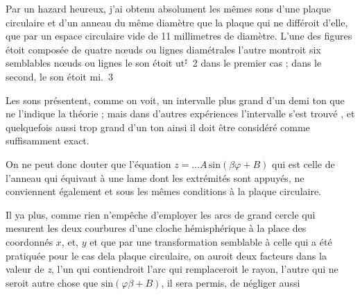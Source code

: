 \documentclass[11pt,a4paper]{article}
\begin{document}
Par un hazard heureux, j'ai obtenu absolument les
mêmes sons  d'une plaque circulaire et d'un anneau
du même diamètre que la plaque qui ne différoit
d'elle, que par un espace circulaire vide de
11 \struck{\ill{}} millimetres de diamètre. L'une des figures
 étoit composée de quatre nœuds ou lignes diamétrales
l'autre montroit six semblables nœuds ou lignes
le son étoit $\text{ut}^{\sharp}$~2 dans le premier cas ; dans le
second, le son étoit mi.~3



Les sons présentent, comme on voit, un intervalle  plus
grand d'un demi ton que ne l'indique la théorie ;
mais dans d'autres expériences l'intervalle s'est trouvé
  , et quelquefois aussi trop grand d'un ton
ainsi il doit être considéré  comme suffisamment
exact. 

On ne peut donc douter que l'équation
$z=\ldots A\,\text{sin}(\beta\varphi+B)$ qui est celle de l'anneau 
 qui équivaut à une lame dont les extrémités
sont appuyés, ne conviennent également et sous les
mêmes conditions à la plaque circulaire.

Il ya plus,  comme rien n'empêche d'employer
les arcs de grand cercle qui mesurent les deux courbures
d'une cloche hémisphérique à la place des
coordonnés $x$, et, $y$ et que par une transformation
semblable à celle qui a été pratiquée pour le cas
dela plaque circulaire, on auroit deux facteurs
dans la valeur de \emph{z}, l'un qui contiendroit l'arc
qui remplaceroit le rayon, l'autre qui 
ne  seroit autre chose
que $\text{sin}(\varphi\beta+B)$, il sera permis, de négliger aussi
\end{document}
